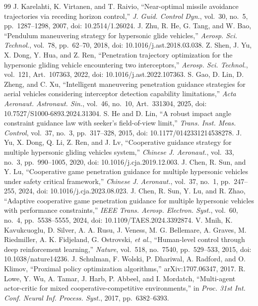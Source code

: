 \documentclass{cja}
\begin{document}
\begin{thebibliography}{99}
J. Karelahti, K. Virtanen, and T. Raivio, ``Near-optimal missile avoidance trajectories via receding horizon control,'' \textit{J. Guid. Control Dyn.}, vol.~30, no.~5, pp.~1287--1298, 2007, doi: 10.2514/1.26024.
J. Zhu, R. He, G. Tang, and W. Bao, ``Pendulum maneuvering strategy for hypersonic glide vehicles,'' \textit{Aerosp. Sci. Technol.}, vol.~78, pp.~62--70, 2018, doi: 10.1016/j.ast.2018.03.038.
Z. Shen, J. Yu, X. Dong, Y. Hua, and Z. Ren, ``Penetration trajectory optimization for the hypersonic gliding vehicle encountering two interceptors,'' \textit{Aerosp. Sci. Technol.}, vol.~121, Art.~107363, 2022, doi: 10.1016/j.ast.2022.107363.
S. Gao, D. Lin, D. Zheng, and C. Xu, ``Intelligent maneuvering penetration guidance strategies for aerial vehicles considering interceptor detection capability limitations,'' \textit{Acta Aeronaut. Astronaut. Sin.}, vol.~46, no.~10, Art.~331304, 2025, doi: 10.7527/S1000-6893.2024.31304.
S. He and D. Lin, ``A robust impact angle constraint guidance law with seeker's field-of-view limit,'' \textit{Trans. Inst. Meas. Control}, vol.~37, no.~3, pp.~317--328, 2015, doi: 10.1177/0142331214538278.
J. Yu, X. Dong, Q. Li, Z. Ren, and J. Lv, ``Cooperative guidance strategy for multiple hypersonic gliding vehicles system,'' \textit{Chinese J. Aeronaut.}, vol.~33, no.~3, pp.~990--1005, 2020, doi: 10.1016/j.cja.2019.12.003.
J. Chen, R. Sun, and Y. Lu, ``Cooperative game penetration guidance for multiple hypersonic vehicles under safety critical framework,'' \textit{Chinese J. Aeronaut.}, vol.~37, no.~1, pp.~247--255, 2024, doi: 10.1016/j.cja.2023.08.023.
J. Chen, R. Sun, Y. Lu, and R. Zhao, ``Adaptive cooperative game penetration guidance for multiple hypersonic vehicles with performance constraints,'' \textit{IEEE Trans. Aerosp. Electron. Syst.}, vol.~60, no.~4, pp.~5538--5555, 2024, doi: 10.1109/TAES.2024.3392874.
V. Mnih, K. Kavukcuoglu, D. Silver, A. A. Rusu, J. Veness, M. G. Bellemare, A. Graves, M. Riedmiller, A. K. Fidjeland, G. Ostrovski, \textit{et al.}, ``Human-level control through deep reinforcement learning,'' \textit{Nature}, vol.~518, no.~7540, pp.~529--533, 2015, doi: 10.1038/nature14236.
J. Schulman, F. Wolski, P. Dhariwal, A. Radford, and O. Klimov, ``Proximal policy optimization algorithms,'' arXiv:1707.06347, 2017.
R. Lowe, Y. Wu, A. Tamar, J. Harb, P. Abbeel, and I. Mordatch, ``Multi-agent actor-critic for mixed cooperative-competitive environments,'' in \textit{Proc. 31st Int. Conf. Neural Inf. Process. Syst.}, 2017, pp.~6382--6393.

\end{thebibliography}
\end{document}
